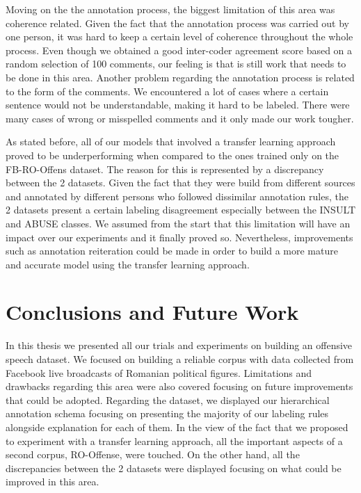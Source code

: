 \documentclass[12pt,a4paper]{report}
\begin{document}
Moving on the the annotation process, the biggest limitation of this area was coherence related. Given the fact that the annotation process was carried out by one person, it was hard to keep a certain level of coherence throughout the whole process. Even though we obtained a good inter-coder agreement score based on a random selection of 100 comments, our feeling is that is still work that needs to be done in this area. Another problem regarding the annotation process is related to the form of the comments. We encountered a lot of cases where a certain sentence would not be understandable, making it hard to be labeled. There were many cases of wrong or misspelled comments and it only made our work tougher.
 
As stated before, all of our models that involved a transfer learning approach proved to be underperforming when compared to the ones trained only on the FB-RO-Offens dataset. The reason for this is represented by a discrepancy between the 2 datasets. Given the fact that they were build from different sources and annotated by different persons who followed dissimilar annotation rules, the 2 datasets present a certain labeling disagreement especially between the INSULT and ABUSE classes. We assumed from the start that this limitation will have an impact over our experiments and it finally proved so. Nevertheless, improvements such as annotation reiteration could be made in order to build a more mature and accurate model using the transfer learning approach.

\chapter{Conclusions and Future Work}
\label{chap:Conclusions}

In this thesis we presented all our trials and experiments on building an offensive speech dataset. We focused on building a reliable corpus with data collected from Facebook live broadcasts of Romanian political figures. Limitations and drawbacks regarding this area were also covered focusing on future improvements that could be adopted. Regarding the dataset, we displayed our hierarchical annotation schema focusing on presenting the majority of our labeling rules alongside explanation for each of them.
In the view of the fact that we proposed to experiment with a transfer learning approach, all the important aspects of a second corpus, RO-Offense, were touched. On the other hand, all the discrepancies between the 2 datasets were displayed focusing on what could be improved in this area.
\end{document}
